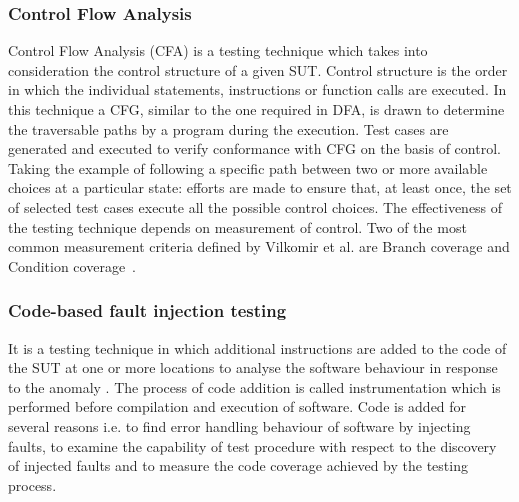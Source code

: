 \subsubsection{Control Flow Analysis}
Control Flow Analysis (CFA) is a testing technique which takes into consideration the control structure of a given SUT. Control structure is the order in which the individual statements, instructions or function calls are executed. In this technique a CFG, similar to the one required in DFA, is drawn to determine the traversable paths by a program during the execution. Test cases are generated and executed to verify conformance with CFG on the basis of control. Taking the example of following a specific path between two or more available choices at a particular state: efforts are made to ensure that, at least once, the set of selected test cases execute all the possible control choices. The effectiveness of the testing technique depends on measurement of control. Two of the most common measurement criteria defined by Vilkomir et al. are Branch coverage and Condition coverage~\cite{vilkomir2003tolerance}. 

\subsubsection{Code-based fault injection testing}
It is a testing technique in which additional instructions are added to the code of the SUT at one or more locations to analyse the software behaviour in response to the anomaly \cite{voas1997software}. The process of code addition is called instrumentation which is performed before compilation and execution of software. Code is added for several reasons i.e. to find error handling behaviour of software by injecting faults, to examine the capability of test procedure with respect to the discovery of injected faults and to measure the code coverage achieved by the testing process.    

